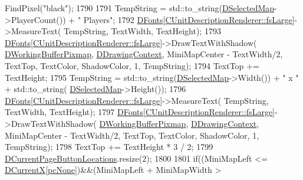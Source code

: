\begin{DoxyCode}
      FindPixel(\textcolor{stringliteral}{"black"});
1790     
1791     TempString = std::to\_string(\hyperlink{classCApplicationData_abf74a18394e479b7090a8f9a55608867}{DSelectedMap}->PlayerCount()) + \textcolor{stringliteral}{" Players"};
1792     \hyperlink{classCApplicationData_afde9247d0a3ea87393ec86dcdb1e8274}{DFonts}[\hyperlink{classCUnitDescriptionRenderer_a3ea4cd83b6dd9533ab3abb953a7da35aaf467097fe4f4811a5e2f1959c86e071d}{CUnitDescriptionRenderer::fsLarge}]->MeasureText(
      TempString, TextWidth, TextHeight);
1793     \hyperlink{classCApplicationData_afde9247d0a3ea87393ec86dcdb1e8274}{DFonts}[\hyperlink{classCUnitDescriptionRenderer_a3ea4cd83b6dd9533ab3abb953a7da35aaf467097fe4f4811a5e2f1959c86e071d}{CUnitDescriptionRenderer::fsLarge}]->DrawTextWithShadow(
      \hyperlink{classCApplicationData_afa34cf2780f38dd28c0c811e69d60a97}{DWorkingBufferPixmap}, \hyperlink{classCApplicationData_aa6c5bea9bdcc64398e5a3f693661d37c}{DDrawingContext}, MiniMapCenter - TextWidth/2, 
      TextTop, TextColor, ShadowColor, 1, TempString);
1794     TextTop += TextHeight;
1795     TempString = std::to\_string(\hyperlink{classCApplicationData_abf74a18394e479b7090a8f9a55608867}{DSelectedMap}->Width()) + \textcolor{stringliteral}{" x "} + std::to\_string(
      \hyperlink{classCApplicationData_abf74a18394e479b7090a8f9a55608867}{DSelectedMap}->Height());
1796     \hyperlink{classCApplicationData_afde9247d0a3ea87393ec86dcdb1e8274}{DFonts}[\hyperlink{classCUnitDescriptionRenderer_a3ea4cd83b6dd9533ab3abb953a7da35aaf467097fe4f4811a5e2f1959c86e071d}{CUnitDescriptionRenderer::fsLarge}]->MeasureText(
      TempString, TextWidth, TextHeight);
1797     \hyperlink{classCApplicationData_afde9247d0a3ea87393ec86dcdb1e8274}{DFonts}[\hyperlink{classCUnitDescriptionRenderer_a3ea4cd83b6dd9533ab3abb953a7da35aaf467097fe4f4811a5e2f1959c86e071d}{CUnitDescriptionRenderer::fsLarge}]->DrawTextWithShadow(
      \hyperlink{classCApplicationData_afa34cf2780f38dd28c0c811e69d60a97}{DWorkingBufferPixmap}, \hyperlink{classCApplicationData_aa6c5bea9bdcc64398e5a3f693661d37c}{DDrawingContext}, MiniMapCenter - TextWidth/2, 
      TextTop, TextColor, ShadowColor, 1, TempString);
1798     TextTop += TextHeight * 3 / 2;
1799     \hyperlink{classCApplicationData_a3615df8e23cea3ce17f11cf61340a7b4}{DCurrentPageButtonLocations}.resize(2);
1800     
1801     \textcolor{keywordflow}{if}((MiniMapLeft <= \hyperlink{classCApplicationData_a1dc7ee482a39f7978c71365ac540f97a}{DCurrentX}[\hyperlink{GameDataTypes_8h_aafb0ca75933357ff28a6d7efbdd7602fa88767aa8e02c7b3192bbab4127b3d729}{pcNone}])&&(MiniMapLeft + MiniMapWidth > 

\end{DoxyCode}
